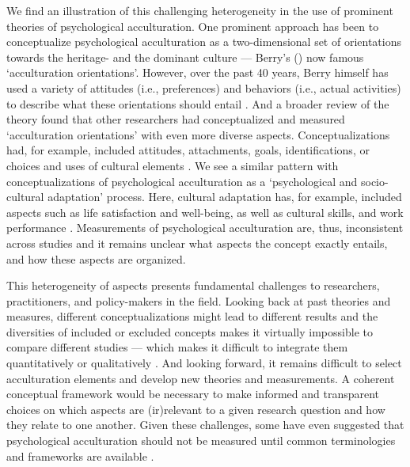 \documentclass[man, 12pt, a4paper, mask]{apa7}
\begin{document}
We find an illustration of this challenging heterogeneity in the use of prominent theories of psychological acculturation. One prominent approach has been to conceptualize psychological acculturation as a two-dimensional set of orientations towards the heritage- and the dominant culture --- Berry's (\citeyear{Berry1980, Berry1997b, Berry2005}) now famous `acculturation orientations'. However, over the past 40 years, Berry himself has used a variety of attitudes (i.e., preferences) and behaviors (i.e., actual activities) to describe what these orientations should entail \citep{Berry2005}. And a broader review of the theory found that other researchers had conceptualized and measured `acculturation orientations' with even more diverse aspects. Conceptualizations had, for example, included attitudes, attachments, goals, identifications, or choices and uses of cultural elements \citep[e.g., language, food, or dresses. See,][]{Rudmin2003a}. We see a similar pattern with conceptualizations of psychological acculturation as a `psychological and socio-cultural adaptation' process. Here, cultural adaptation has, for example, included aspects such as life satisfaction and well-being, as well as cultural skills, and work performance \citep{Searle1990, Ward2001, Berry2003}.
Measurements of psychological acculturation are, thus, inconsistent across studies and it remains unclear what aspects the concept exactly entails, and how these aspects are organized.

This heterogeneity of aspects presents fundamental challenges to researchers, practitioners, and policy-makers in the field. Looking back at past theories and measures, different conceptualizations might lead to different results \citep{Snauwaert2003} and the diversities of included or excluded concepts makes it virtually impossible to compare different studies --- which makes it difficult to integrate them quantitatively or qualitatively \citep{Taft1981}.
And looking forward, it remains difficult to select acculturation elements and develop new theories and measurements. A coherent conceptual framework would be necessary to make informed and transparent choices on which aspects are (ir)relevant to a given research question and how they relate to one another.
Given these challenges, some have even suggested that psychological acculturation should not be measured until common terminologies and frameworks are available \citep{Escobar2000}.
\end{document}
